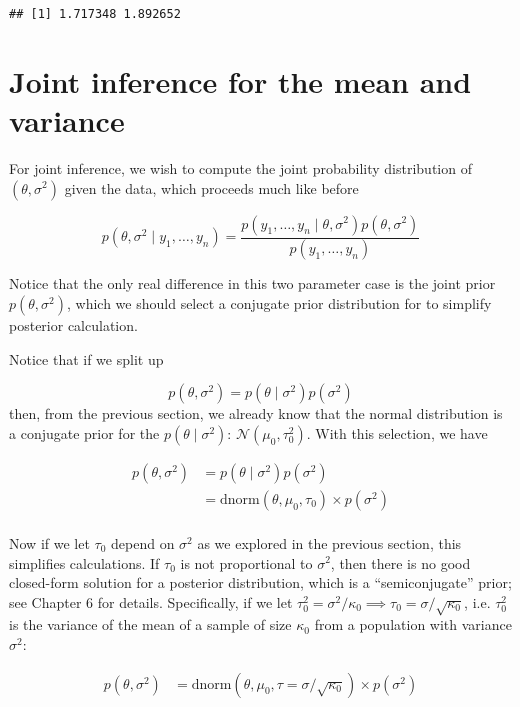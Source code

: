 \documentclass[]{article}
\begin{document}
\begin{verbatim}
## [1] 1.717348 1.892652
\end{verbatim}

\hypertarget{joint-inference-for-the-mean-and-variance}{%
\section{Joint inference for the mean and
variance}\label{joint-inference-for-the-mean-and-variance}}

For joint inference, we wish to compute the joint probability
distribution of \((\theta, \sigma^2)\) given the data, which proceeds
much like before

\[
p(\theta, \sigma^2 \mid y_1, \dots, y_n) = \frac{p(y_1, \dots, y_n \mid \theta, \sigma^2) p(\theta, \sigma^2)}{p(y_1, \dots, y_n)}
\]

Notice that the only real difference in this two parameter case is the
joint prior \(p(\theta, \sigma^2)\), which we should select a conjugate
prior distribution for to simplify posterior calculation.

Notice that if we split up

\[p(\theta, \sigma^2) = p(\theta \mid \sigma^2) p(\sigma^2)\] then, from
the previous section, we already know that the normal distribution is a
conjugate prior for the \(p(\theta \mid \sigma^2)\):
\(\mathcal{N}(\mu_0, \tau_0^2)\). With this selection, we have

\begin{align}
p(\theta, \sigma^2) &= p(\theta \mid \sigma^2) p(\sigma^2) \\
&= \text{dnorm}(\theta, \mu_0, \tau_0) \times p(\sigma^2) \\
\end{align}

Now if we let \(\tau_0\) depend on \(\sigma^2\) as we explored in the
previous section, this simplifies calculations. If \(\tau_0\) is not
proportional to \(\sigma^2\), then there is no good closed-form solution
for a posterior distribution, which is a ``semiconjugate'' prior; see
Chapter 6 for details. Specifically, if we let
\(\tau_0^2 = \sigma^2 / \kappa_0 \implies \tau_0 = \sigma / \sqrt{\kappa_0}\),
i.e. \(\tau_0^2\) is the variance of the mean of a sample of size
\(\kappa_0\) from a population with variance \(\sigma^2\):

\begin{align}
p(\theta, \sigma^2) &= \text{dnorm}(\theta, \mu_0, \tau = \sigma / \sqrt{\kappa_0}) \times p(\sigma^2)
\end{align}
\end{document}

